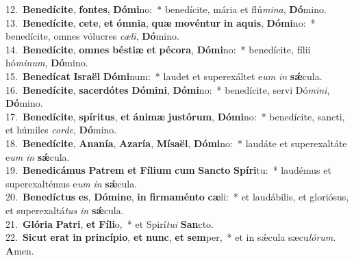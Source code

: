 {12.~}\textbf{Be}\textbf{ne}\textbf{dí}\textbf{ci}\textbf{te}, \textbf{fon}\textbf{tes}, \textbf{Dó}\textbf{mi}no:~* benedícite, mária et flú\textit{mi}\textit{na}, \textbf{Dó}mino.\\
{13.~}\textbf{Be}\textbf{ne}\textbf{dí}\textbf{ci}\textbf{te}, \textbf{ce}\textbf{te}, \textbf{et} \textbf{óm}\textbf{ni}\textbf{a}, \textbf{quæ} \textbf{mo}\textbf{vén}\textbf{tur} \textbf{in} \textbf{a}\textbf{quis}, \textbf{Dó}\textbf{mi}no:~* benedícite, omnes vólucres \textit{cæ}\textit{li}, \textbf{Dó}mino.\\
{14.~}\textbf{Be}\textbf{ne}\textbf{dí}\textbf{ci}\textbf{te}, \textbf{om}\textbf{nes} \textbf{bé}\textbf{sti}\textbf{æ} \textbf{et} \textbf{pé}\textbf{co}\textbf{ra}, \textbf{Dó}\textbf{mi}no:~* benedícite, fílii hó\textit{mi}\textit{num}, \textbf{Dó}mino.\\
{15.~}\textbf{Be}\textbf{ne}\textbf{dí}\textbf{cat} \textbf{Is}\textbf{ra}\textbf{ël} \textbf{Dó}\textbf{mi}num:~* laudet et superexáltet e\textit{um} \textit{in} \textbf{sǽ}cula.\\
{16.~}\textbf{Be}\textbf{ne}\textbf{dí}\textbf{ci}\textbf{te}, \textbf{sa}\textbf{cer}\textbf{dó}\textbf{tes} \textbf{Dó}\textbf{mi}\textbf{ni}, \textbf{Dó}\textbf{mi}no:~* benedícite, servi Dó\textit{mi}\textit{ni}, \textbf{Dó}mino.\\
{17.~}\textbf{Be}\textbf{ne}\textbf{dí}\textbf{ci}\textbf{te}, \textbf{spí}\textbf{ri}\textbf{tus}, \textbf{et} \textbf{á}\textbf{ni}\textbf{mæ} \textbf{ju}\textbf{stó}\textbf{rum}, \textbf{Dó}\textbf{mi}no:~* benedícite, sancti, et húmiles \textit{cor}\textit{de}, \textbf{Dó}mino.\\
{18.~}\textbf{Be}\textbf{ne}\textbf{dí}\textbf{ci}\textbf{te}, \textbf{A}\textbf{na}\textbf{ní}\textbf{a}, \textbf{A}\textbf{za}\textbf{rí}\textbf{a}, \textbf{Mí}\textbf{sa}\textbf{ël}, \textbf{Dó}\textbf{mi}no:~* laudáte et superexaltáte e\textit{um} \textit{in} \textbf{sǽ}cula.\\
{19.~}\textbf{Be}\textbf{ne}\textbf{di}\textbf{cá}\textbf{mus} \textbf{Pa}\textbf{trem} \textbf{et} \textbf{Fí}\textbf{li}\textbf{um} \textbf{cum} \textbf{San}\textbf{cto} \textbf{Spí}\textbf{ri}tu:~* laudémus et superexaltémus e\textit{um} \textit{in} \textbf{sǽ}cula.\\
{20.~}\textbf{Be}\textbf{ne}\textbf{dí}\textbf{ctus} \textbf{es}, \textbf{Dó}\textbf{mi}\textbf{ne}, \textbf{in} \textbf{fir}\textbf{ma}\textbf{mén}\textbf{to} \textbf{cæ}li:~* et laudábilis, et gloriósus, et superexaltá\textit{tus} \textit{in} \textbf{sǽ}cula.\\
{21.~}\textbf{Gló}\textbf{ri}\textbf{a} \textbf{Pa}\textbf{tri}, \textbf{et} \textbf{Fí}\textbf{li}o,~* et Spirí\textit{tu}\textit{i} \textbf{San}cto.\\
{22.~}\textbf{Si}\textbf{cut} \textbf{e}\textbf{rat} \textbf{in} \textbf{prin}\textbf{cí}\textbf{pi}\textbf{o}, \textbf{et} \textbf{nunc}, \textbf{et} \textbf{sem}per,~* et in sǽcula sæcu\textit{ló}\textit{rum}. \textbf{A}men.\\
